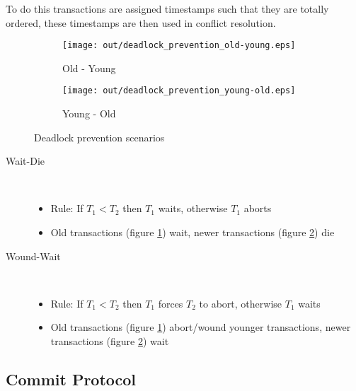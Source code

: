 \documentclass[a4paper]{article}
\begin{document}
To do this transactions are assigned timestamps such that they are totally
ordered, these timestamps are then used in conflict resolution.

\begin{figure}[h]
  \centering
  \begin{subfigure}[b]{0.4\textwidth}
    \texttt{[image: out/deadlock\_prevention\_old-young.eps]}
    \caption{Old - Young}
    \label{fig:deadlock_prevention_old-young}
  \end{subfigure}
  \begin{subfigure}[b]{0.4\textwidth}
    \texttt{[image: out/deadlock\_prevention\_young-old.eps]}
    \caption{Young - Old}
    \label{fig:deadlock_prevention_young-old}
  \end{subfigure}
  \caption{Deadlock prevention scenarios}
  \label{fig:deadlock_prevention}
\end{figure}
\FloatBarrier

\begin{description}
  \item[Wait-Die] \hfill \\
    \begin{itemize}
      \item Rule: If $T_{1} < T_{2}$ then $T_{1}$ waits, otherwise $T_{1}$
            aborts
      \item Old transactions (figure \ref{fig:deadlock_prevention_old-young})
            wait, newer transactions (figure
            \ref{fig:deadlock_prevention_young-old}) die
    \end{itemize}

  \item[Wound-Wait] \hfill \\
    \begin{itemize}
      \item Rule: If $T_{1} < T_{2}$ then $T_{1}$ forces $T_{2}$ to abort,
            otherwise $T_{1}$ waits
      \item Old transactions (figure \ref{fig:deadlock_prevention_old-young})
            abort/wound younger transactions, newer transactions (figure
            \ref{fig:deadlock_prevention_young-old}) wait
    \end{itemize}

\end{description}

\subsection{Commit Protocol}
\end{document}
